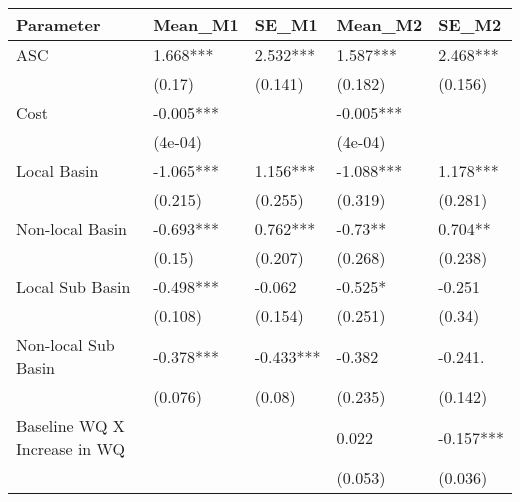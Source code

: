 \begin{table}[ht]
\centering
\begin{tabular}{lllll}
  \hline
Parameter & Mean\_M1 & SE\_M1 & Mean\_M2 & SE\_M2 \\ 
  \hline
ASC & 1.668*** & 2.532*** & 1.587*** & 2.468*** \\ 
   & (0.17) & (0.141) & (0.182) & (0.156) \\ 
  Cost & -0.005*** &  & -0.005*** &  \\ 
   & (4e-04) &  & (4e-04) &  \\ 
  Local Basin & -1.065*** & 1.156*** & -1.088*** & 1.178*** \\ 
   & (0.215) & (0.255) & (0.319) & (0.281) \\ 
  Non-local Basin & -0.693*** & 0.762*** & -0.73** & 0.704** \\ 
   & (0.15) & (0.207) & (0.268) & (0.238) \\ 
  Local Sub Basin & -0.498*** & -0.062 & -0.525* & -0.251 \\ 
   & (0.108) & (0.154) & (0.251) & (0.34) \\ 
  Non-local Sub Basin & -0.378*** & -0.433*** & -0.382 & -0.241. \\ 
   & (0.076) & (0.08) & (0.235) & (0.142) \\ 
  Baseline WQ X Increase in WQ &  &  & 0.022 & -0.157*** \\ 
   &  &  & (0.053) & (0.036) \\ 
   \hline
\end{tabular}
\end{table}

